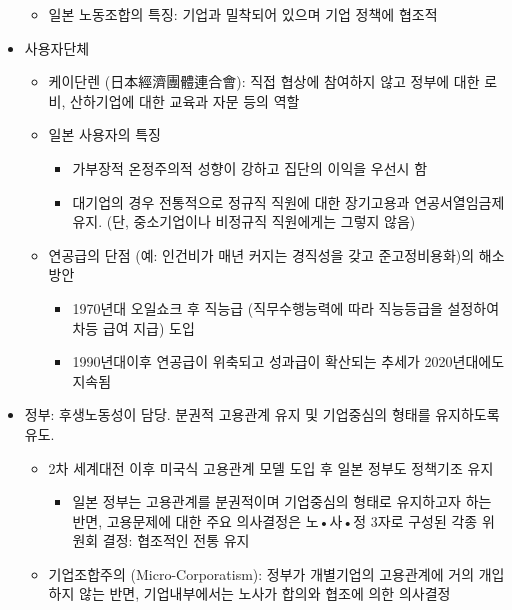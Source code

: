 \documentclass[aspectratio=169,xcolor=dvipsnames,handout]{beamer}
\begin{document}
\begin{frame}[allowframebreaks]
\begin{itemize}[<+->]
\begin{itemize}
\begin{itemize}
            \end{itemize}
            \item 일본 노동조합의 특징: 기업과 밀착되어 있으며 기업 정책에 협조적
        \end{itemize}
    \framebreak%
        \item 사용자단체
        \begin{itemize}
            \item 케이단렌 (日本經濟團體連合會): 직접 협상에 참여하지 않고 정부에 대한 로비, 산하기업에 대한 교육과 자문 등의 역할
            \item 일본 사용자의 특징 
            \begin{itemize}
                \item 가부장적 온정주의적 성향이 강하고 집단의 이익을 우선시 함
                \item 대기업의 경우 전통적으로 정규직 직원에 대한 장기고용과 연공서열임금제 유지. (단, 중소기업이나 비정규직 직원에게는 그렇지 않음) 
            \end{itemize}
            \item 연공급의 단점 (예: 인건비가 매년 커지는 경직성을 갖고 준고정비용화)의 해소방안
            \begin{itemize}
                \item 1970년대 오일쇼크 후 직능급 (직무수행능력에 따라 직능등급을 설정하여 차등 급여 지급) 도입
                \item 1990년대이후 연공급이 위축되고 성과급이 확산되는 추세가 2020년대에도 지속됨 
            \end{itemize}
        \end{itemize}
    \framebreak%
        \item 정부: 후생노동성이 담당. 분권적 고용관계 유지 및 기업중심의 형태를 유지하도록 유도.
        \begin{itemize}
            \item 2차 세계대전 이후 미국식 고용관계 모델 도입 후 일본 정부도 정책기조 유지
            \begin{itemize}
                \item 일본 정부는 고용관계를 분권적이며 기업중심의 형태로 유지하고자 하는 반면, 고용문제에 대한 주요 의사결정은 노•사•정 3자로 구성된 각종 위원회 결정: 협조적인 전통 유지
            \end{itemize}
            \item 기업조합주의 (Micro-Corporatism): 정부가 개별기업의 고용관계에 거의 개입하지 않는 반면, 기업내부에서는 노사가 합의와 협조에 의한 의사결정 
        \end{itemize}
    \end{itemize}
\end{frame}
\end{document}
